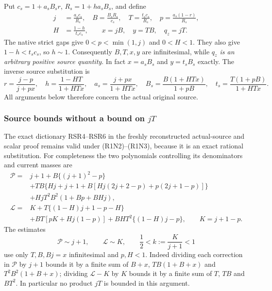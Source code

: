 Put $c_s=1+a_sB_sr$, $R_s=1+ha_sB_s$, and define
\[
\begin{aligned}
 j&=\frac{a_sc_s}{R_s},\quad B=\frac{B_sR_s}{c_s},\quad
 T=\frac{t_sc_s}{R_s},\quad p=\frac{a_s(1-r)}{R_s},\\
 H&=\frac{1-h}{t_sc_s},\qquad x=jB,\quad y=TB,\quad q_z=jT.
\end{aligned}                                          \tag{R1N2}
\]
The native strict gaps give $0<p<\min(1,j)$ and $0<H<1$.
They also give $1-h<t_sc_s$, so $h\sim1$.
Consequently $B,T,x,y$ are infinitesimal, while
\emph{$q_z$ is an arbitrary positive source quantity}.
In fact $x=a_sB_s$ and $y=t_sB_s$ exactly.
The inverse source substitution is
\[
 r=\frac{j-p}{j+px},\quad h=\frac{1-HT}{1+HTx},\quad
 a_s=\frac{j+px}{1+HTx},\quad
 B_s=\frac{B(1+HTx)}{1+pB},\quad
 t_s=\frac{T(1+pB)}{1+HTx}.                             \tag{R1N3}
\]
All arguments below therefore concern the actual original source.

\subsubsection*{Source bounds without a bound on \(jT\)}

The exact dictionary RSR4--RSR6 in the freshly reconstructed
actual-source and scalar proof remains valid under
(R1N2)--(R1N3), because it is an exact rational substitution.
For completeness the two polynomials controlling its denominators
and current masses are
\begin{align*}
 \mathcal P={}&j+1+B\{(j+1)^2-p\}\\
 &+TB\{Hj+j+1+B[Hj(2j+2-p)+p(2j+1-p)]\}\\
 &+HjT^2B^2(1+Bp+BHj),\\
 \mathcal L={}&K+T\{(1-H)j+1-p-H\}\\
 &+BT[pK+Hj(1-p)]+BHT^2\{(1-H)j-p\},
 \qquad K=j+1-p .
\end{align*}
The estimates
\[
 \mathcal P\sim j+1,\qquad \mathcal L\sim K,\qquad
 \frac12<k:=\frac K{j+1}<1                               \tag{R1N4}
\]
use only $T,B,Bj=x$ infinitesimal and $p,H<1$.
Indeed dividing each correction in $\mathcal P$ by $j+1$ bounds it
by a finite sum of $B+x$, $TB(1+B+x)$ and
$T^2B^2(1+B+x)$; dividing $\mathcal L-K$ by $K$ bounds it
by a finite sum of $T$, $TB$ and $BT^2$.
In particular no product $jT$ is bounded in this argument.

